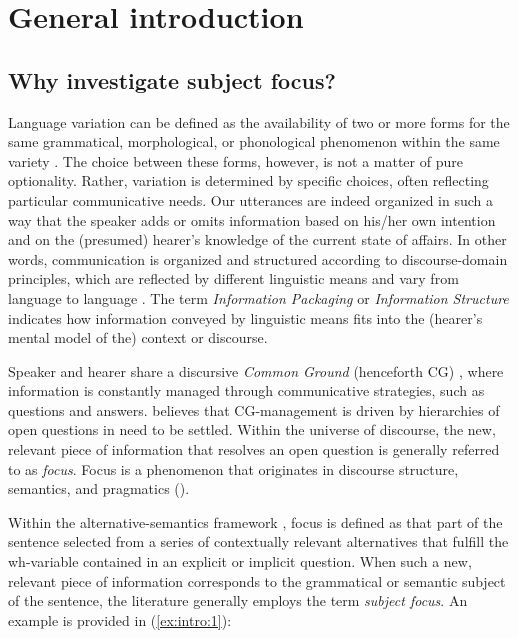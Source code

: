\chapter{General introduction}


\section{Why investigate subject focus?} \label{sub:1.1}
\largerpage
Language variation can be defined as the availability of two or more forms for the same grammatical, morphological, or phonological phenomenon within the same variety \parencite{labov1972sociolinguistic}. The choice between these forms, however, is not a matter of pure optionality. Rather, variation is determined by specific choices, often reflecting particular communicative needs. Our utterances are indeed organized in such a way that the speaker adds or omits information based on his/her own intention and on the (presumed) hearer’s knowledge of the current state of affairs. In other words, communication is  organized and structured according to discourse-domain principles, which are reflected by different linguistic means and vary from language to language \parencite{krifka2008basic, komagata2003contextual, wardbirner2001discourse}. The term \textit{Information Packaging} \parencite{chafe1976givenness} or \textit{Information Structure} \parencite{halliday_1967} indicates how information conveyed by linguistic means fits into the (hearer’s mental model of the) context or discourse.

Speaker and hearer share a discursive \textit{Common Ground} (henceforth CG) \parencite{stalnaker1974pragmatic, karttunen1974presupposition, lewis1979scorekeeping, simons2025availability}, where information is constantly managed through communicative strategies, such as questions and answers. \textcite{roberts1996information} believes that CG-management is driven by hierarchies of open questions in need to be settled. Within the universe of discourse, the new, relevant piece of information that resolves an open question is generally referred to as \textit{focus}. Focus is a phenomenon that originates in discourse structure, semantics, and pragmatics (\cite{krifka2008basic, rooth1985association, rooth1992theory, schwarzschild1999givenness, von1990current}). 

Within the alternative-semantics framework \parencite{rooth1985association, rooth1992theory}, focus is defined as that part of the sentence selected from a series of contextually relevant alternatives that fulfill the wh-variable contained in an explicit or implicit question. 
When such a new, relevant piece of information corresponds to the grammatical or semantic subject of the sentence, the literature generally employs the term \textit{subject focus}. An example is provided in (\ref{ex:intro:1}):

